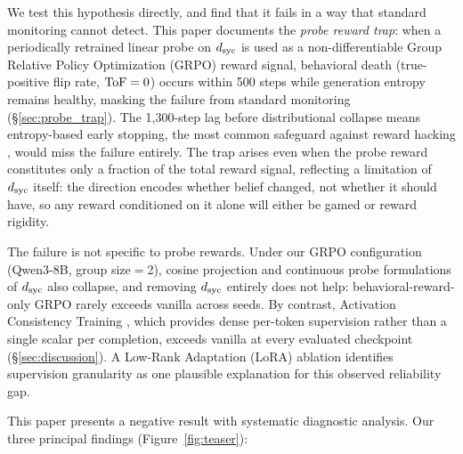 We test this hypothesis directly, and find that it fails in a way that standard monitoring cannot detect.
This paper documents the \emph{probe reward trap}: when a periodically retrained linear probe on $d_{\text{syc}}$ is used as a non-differentiable Group Relative Policy Optimization (GRPO) reward signal, behavioral death (true-positive flip rate, $\text{ToF} = 0$) occurs within 500 steps while generation entropy remains healthy, masking the failure from standard monitoring (\S\ref{sec:probe_trap}).
The 1{,}300-step lag before distributional collapse means entropy-based early stopping, the most common safeguard against reward hacking \citep{casper2023openproblems}, would miss the failure entirely.
The trap arises even when the probe reward constitutes only a fraction of the total reward signal, reflecting a limitation of $d_{\text{syc}}$ itself: the direction encodes whether belief changed, not whether it should have, so any reward conditioned on it alone will either be gamed or reward rigidity.

The failure is not specific to probe rewards.
Under our GRPO configuration (Qwen3-8B, group size$=$2), cosine projection and continuous probe formulations of $d_{\text{syc}}$ also collapse, and removing $d_{\text{syc}}$ entirely does not help: behavioral-reward-only GRPO rarely exceeds vanilla across seeds.
By contrast, Activation Consistency Training \citep[ACT;][]{consistency2025bctact}, which provides dense per-token supervision rather than a single scalar per completion, exceeds vanilla at every evaluated checkpoint (\S\ref{sec:discussion}).
A Low-Rank Adaptation (LoRA) ablation identifies supervision granularity as one plausible explanation for this observed reliability gap.

This paper presents a negative result with systematic diagnostic analysis.
Our three principal findings (Figure~\ref{fig:teaser}):


